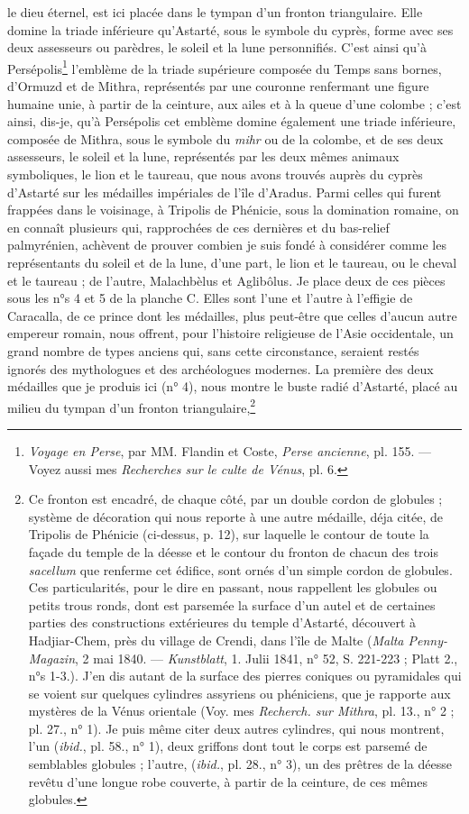 \documentclass[a4paper, 11pt, oneside, polutonikogreek, french]{article}
\begin{document}
le dieu éternel, est ici placée dans le tympan d'un fronton triangulaire. Elle domine la triade inférieure qu'Astarté, sous le symbole du cyprès, forme avec ses deux assesseurs ou parèdres, le soleil et la lune personnifiés. C'est ainsi qu'à Persépolis\footnote{\emph{Voyage en Perse}, par MM. Flandin et Coste, \emph{Perse ancienne}, pl. 155. --- Voyez aussi mes \emph{Recherches sur le culte de Vénus}, pl. 6.} l'emblème de la triade supérieure composée du Temps sans bornes, d'Ormuzd et de Mithra, représentés par une couronne renfermant une figure humaine unie, à partir de la ceinture, aux ailes et à la queue d'une colombe ; c'est ainsi, dis-je, qu'à Persépolis cet emblème domine également une triade inférieure, composée de Mithra, sous le symbole du \emph{mihr} ou de la colombe, et de ses deux assesseurs, le soleil et la lune, représentés par les deux mêmes animaux symboliques, le lion et le taureau, que nous avons trouvés auprès du cyprès d'Astarté sur les médailles impériales de l'île d'Aradus. Parmi celles qui furent frappées dans le voisinage, à Tripolis de Phénicie, sous la domination romaine, on en connaît plusieurs qui, rapprochées de ces dernières et du bas-relief palmyrénien, achèvent de prouver combien je suis fondé à considérer comme les représentants du soleil et de la lune, d'une part, le lion et le taureau, ou le cheval et le taureau ; de l'autre, Malachbèlus et Aglibôlus. Je place deux de ces pièces sous les n°s 4 et 5 de la planche C. Elles sont l'une et l'autre à l'effigie de Caracalla, de ce prince dont les médailles, plus peut-être que celles d'aucun autre empereur romain, nous offrent, pour l'histoire religieuse de l'Asie occidentale, un grand nombre de types anciens qui, sans cette circonstance, seraient restés ignorés des mythologues et des archéologues modernes. La première des deux médailles que je produis ici (n° 4), nous montre le buste radié d'Astarté, placé au milieu du tympan d'un fronton triangulaire,\footnote{Ce fronton est encadré, de chaque côté, par un double cordon de globules ; système de décoration qui nous reporte à une autre médaille, déja citée, de Tripolis de Phénicie (ci-dessus, p. 12), sur laquelle le contour de toute la façade du temple de la déesse et le contour du fronton de chacun des trois \emph{sacellum} que renferme cet édifice, sont ornés d'un simple cordon de globules. Ces particularités, pour le dire en passant, nous rappellent les globules ou petits trous ronds, dont est parsemée la surface d'un autel et de certaines parties des constructions extérieures du temple d'Astarté, découvert à Hadjiar-Chem, près du village de Crendi, dans l'île de Malte (\emph{Malta Penny-Magazin}, 2 mai 1840. --- \emph{Kunstblatt}, 1. Julii 1841, n° 52, S. 221-223 ; Platt 2., n°s 1-3.). J'en dis autant de la surface des pierres coniques ou pyramidales qui se voient sur quelques cylindres assyriens ou phéniciens, que je rapporte aux mystères de la Vénus orientale (Voy. mes \emph{Recherch. sur Mithra}, pl. 13., n° 2 ; pl. 27., n° 1). Je puis même citer deux autres cylindres, qui nous montrent, l'un (\emph{ibid.}, pl. 58., n° 1), deux griffons dont tout le corps est parsemé de semblables globules ; l'autre, (\emph{ibid.}, pl. 28., n° 3), un des prêtres de la déesse revêtu d'une longue robe couverte, à partir de la ceinture, de ces mêmes globules.} 
\end{document}
